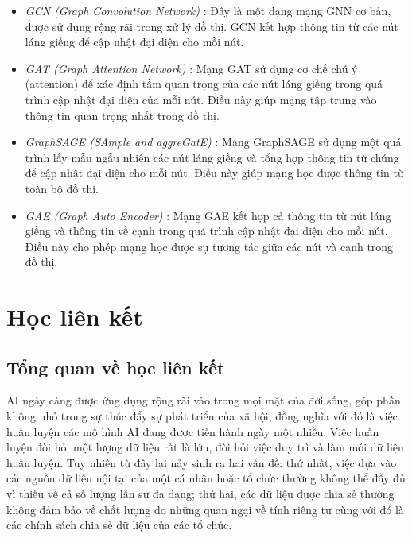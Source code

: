 \begin{itemize}
    \item \textit{GCN (Graph Convolution Network)} \cite{kipf2016semi}: Đây là một dạng mạng GNN cơ bản, được sử dụng rộng rãi trong xử lý đồ thị. GCN kết hợp thông tin từ các nút láng giềng để cập nhật đại diện cho mỗi nút.

    \item \textit{GAT (Graph Attention Network)} \cite{velivckovic2017graph}: Mạng GAT sử dụng cơ chế chú ý (attention) để xác định tầm quan trọng của các nút láng giềng trong quá trình cập nhật đại diện của mỗi nút. Điều này giúp mạng tập trung vào thông tin quan trọng nhất trong đồ thị.

    \item \textit{GraphSAGE (SAmple and aggreGatE)} \cite{hamilton2017inductive}: Mạng GraphSAGE sử dụng một quá trình lấy mẫu ngẫu nhiên các nút láng giềng và tổng hợp thông tin từ chúng để cập nhật đại diện cho mỗi nút. Điều này giúp mạng học được thông tin từ toàn bộ đồ thị.

    \item \textit{GAE (Graph Auto Encoder)} \cite{kipf2016variational}: Mạng GAE kết hợp cả thông tin từ nút láng giềng và thông tin về cạnh trong quá trình cập nhật đại diện cho mỗi nút. Điều này cho phép mạng học được sự tương tác giữa các nút và cạnh trong đồ thị.
\end{itemize}

\section{Học liên kết}

\subsection{Tổng quan về học liên kết}

AI ngày càng được ứng dụng rộng rãi vào trong mọi mặt của đời sống, góp phần không nhỏ trong sự thúc đẩy sự phát triển của xã hội, đồng nghĩa với đó là việc huấn luyện các mô hình AI đang được tiến hành ngày một nhiều. Việc huấn luyện đòi hỏi một lượng dữ liệu rất là lớn, đòi hỏi việc duy trì và làm mới dữ liệu huấn luyện. Tuy nhiên từ đây lại nảy sinh ra hai vấn đề: thứ nhất, việc dựa vào các nguồn dữ liệu nội tại của một cá nhân hoặc tổ chức thường không thể đầy đủ vì thiếu về cả số lượng lẫn sự đa dạng; thứ hai, các dữ liệu được chia sẻ thường không đảm bảo về chất lượng do những quan ngại về tính riêng tư cùng với đó là các chính sách chia sẻ dữ liệu của các tổ chức.

